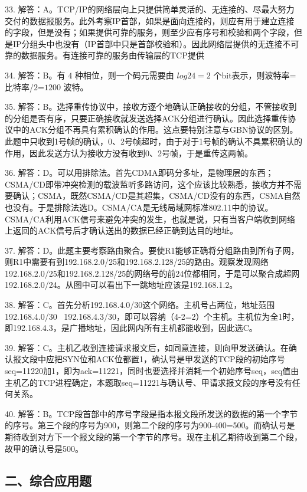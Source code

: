 33. 解答：A。TCP/IP的网络层向上只提供简单灵活的、无连接的、尽最大努力交付的数据报服务。此外考察IP首部，如果是面向连接的，则应有用于建立连接的字段，但是没有；如果提供可靠的服务，则至少应有序号和校验和两个字段，但是IP分组头中也没有（IP首部中只是首部校验和）。因此网络层提供的无连接不可靠的数据服务。有连接可靠的服务由传输层的TCP提供

34. 解答：B。有 $4$ 种相位，则一个码元需要由 $log24=2$ 个bit表示，则波特率=比特率/$2$=$1200$ 波特。

35. 解答：B。选择重传协议中，接收方逐个地确认正确接收的分组，不管接收到的分组是否有序，只要正确接收就发送选择ACK分组进行确认。因此选择重传协议中的ACK分组不再具有累积确认的作用。这点要特别注意与GBN协议的区别。此题中只收到1号帧的确认，0、2号帧超时，由于对于1号帧的确认不具累积确认的作用，因此发送方认为接收方没有收到0、2号帧，于是重传这两帧。

36. 解答：D。可以用排除法。首先CDMA即码分多址，是物理层的东西；CSMA/CD即带冲突检测的载波监听多路访问，这个应该比较熟悉，接收方并不需要确认；CSMA，既然CSMA/CD是其超集，CSMA/CD没有的东西，CSMA自然也没有。于是排除法选D。CSMA/CA是无线局域网标准802.11中的协议。CSMA/CA利用ACK信号来避免冲突的发生，也就是说，只有当客户端收到网络上返回的ACK信号后才确认送出的数据已经正确到达目的地址。

37. 解答：D。此题主要考察路由聚合。要使R1能够正确将分组路由到所有子网，则R1中需要有到192.168.2.0/25和192.168.2.128/25的路由。观察发现网络192.168.2.0/25和192.168.2.128/25的网络号的前24位都相同，于是可以聚合成超网192.168.2.0/24。从图中可以看出下一跳地址应该是192.168.1.2。

38. 解答：C。首先分析192.168.4.0/30这个网络。主机号占两位，地址范围192.168.4.0/30~ 192.168.4.3/30，即可以容纳（4-2=2）个主机。主机位为全1时，即192.168.4.3，是广播地址，因此网内所有主机都能收到，因此选C。

39. 解答：C。主机乙收到连接请求报文后，如同意连接，则向甲发送确认。在确认报文段中应把SYN位和ACK位都置1，确认号是甲发送的TCP段的初始序号seq=11220加1，即为ack=11221，同时也要选择并消耗一个初始序号seq，seq值由主机乙的TCP进程确定，本题取seq=11221与确认号、甲请求报文段的序号没有任何关系。

40. 解答：B。TCP段首部中的序号字段是指本报文段所发送的数据的第一个字节的序号。第三个段的序号为900，则第二个段的序号为900-400=500。而确认号是期待收到对方下一个报文段的第一个字节的序号。现在主机乙期待收到第二个段，故甲的确认号是500。


\subsection{二、综合应用题}

